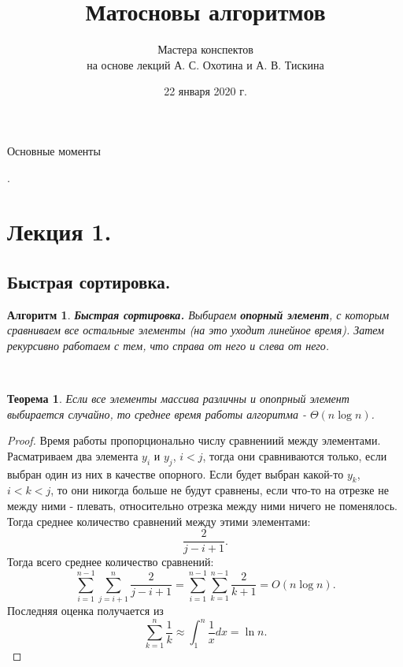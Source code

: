 \documentclass[a4paper]{article}
\title{Матосновы алгоритмов}
\author{Мастера конспектов \\ на основе лекций А. С. Охотина и А. В. Тискина}
\date{22 января 2020 г.}
\theoremstyle{indented}
\newtheorem{theorem}{Теорема}
\newtheorem{alg}{Алгоритм}
\theoremstyle{definition}
\theoremstyle{remark}
\begin{document}
\newcommand{\resetexlcounters}{%
  \setcounter{exl}{0}%
} 

\newcommand{\resetremarkcounters}{%
  \setcounter{remark}{0}%
} 

\newcommand{\reseconscounters}{%
  \setcounter{cons}{0}%
} 

\newcommand{\resetall}{%
    \resetexlcounters
    \resetremarkcounters
    \reseconscounters%
}

\maketitle 

\newpage

\hypertarget{t1}{Основные моменты}. 
\tableofcontents

\newpage

\section{Лекция 1.}

\subsection{Быстрая сортировка.}

\begin{alg}
    \textbf{Быстрая сортировка.} Выбираем \textbf{опорный элемент}, с которым сравниваем все остальные элементы (на это уходит линейное время). Затем рекурсивно работаем с тем, что справа от него и слева от него.
\end{alg} \ 

\begin{theorem}
    Если все элементы массива различны и опопрный элемент выбирается случайно, то среднее время работы алгоритма - $\Theta(n\log n)$.
\end{theorem}

\begin{proof}
    Время работы пропорционально числу сравнениий между элементами. Расматриваем два элемента $y_i$ и $y_j$, $i<j$, тогда они сравниваются только, если выбран один из них в качестве опорного. Если будет выбран какой-то $y_k$, $i<k<j$, то они никогда больше не будут сравнены, если что-то на отрезке не между ними - плевать, относительно отрезка между ними ничего не поменялось. Тогда среднее количество сравнений между этими элементами: 
    \[
        \frac{2}{j-i+1}. 
    \]
    Тогда всего среднее количество сравнений: 
    \[
        \sum_{i=1}^{n-1}\sum_{j=i+1}^n \frac{2}{j-i+1} = \sum_{i=1}^{n-1}\sum_{k=1}^{n-1} \frac{2}{k+1}= O(n\log n).
    \]
    Последняя оценка получается из
    \[
        \sum_{k=1}^n\frac{1}{k} \approx \int_1^n \frac{1}{x}dx = \ln n. 
    \]
\end{proof}
\end{document}

